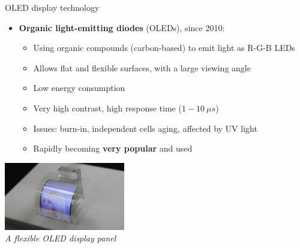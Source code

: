 \begin{frame}{OLED display technology}
  \begin{itemize}
  \item \textbf{Organic light-emitting diodes} (OLEDs), since 2010:
    \begin{itemize}
    \item Using organic compounds (carbon-based) to emit light as R-G-B LEDs
    \item Allows flat and flexible surfaces, with a large viewing angle
    \item Low energy consumption
    \item Very high contrast, high response time (\(1-10~\mu s\))
    \item Issues: burn-in, independent cells aging, affected by UV light
    \item Rapidly becoming \textbf{very popular} and used
    \end{itemize}
  \end{itemize}

  \begin{center}
  \includegraphics[height=8em]{slides/graphics-hardware/oled-display.jpg}\\
  \textit{\small A flexible OLED display panel}
  \end{center}
\end{frame}

